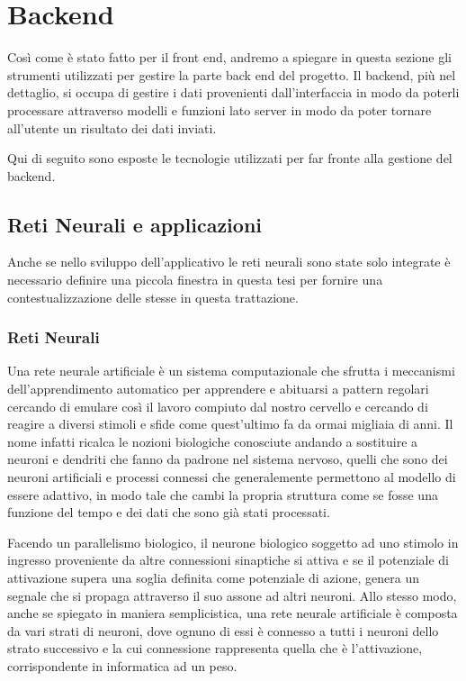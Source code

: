 \chapter{Backend}\label{ch:backend}

Così come è stato fatto per il front end, andremo a spiegare in questa sezione gli strumenti utilizzati per gestire la parte back end del progetto. Il backend, più nel dettaglio, si occupa di gestire i dati provenienti dall'interfaccia in modo da poterli processare attraverso modelli e funzioni lato server in modo da poter tornare all'utente un risultato dei dati inviati.

Qui di seguito sono esposte le tecnologie utilizzati per far fronte alla gestione del backend.

\section{Reti Neurali e applicazioni}

Anche se nello sviluppo dell'applicativo le reti neurali sono state solo integrate è necessario definire una piccola finestra in questa tesi per fornire una contestualizzazione delle stesse in questa trattazione.

\subsection{Reti Neurali}

Una rete neurale artificiale è un sistema computazionale che sfrutta i meccanismi dell'apprendimento automatico per apprendere e abituarsi a pattern regolari cercando di emulare così il lavoro compiuto dal nostro cervello e cercando di reagire a diversi stimoli e sfide come quest'ultimo fa da ormai migliaia di anni. Il nome infatti ricalca le nozioni biologiche conosciute andando a sostituire a neuroni e dendriti che fanno da padrone nel sistema nervoso, quelli che sono dei neuroni artificiali e processi connessi che generalemente permettono al modello di essere adattivo, in modo tale che cambi la propria struttura come se fosse una funzione del tempo e dei dati che sono già stati processati.

Facendo un parallelismo biologico, il neurone biologico soggetto ad uno stimolo in ingresso proveniente da altre connessioni sinaptiche  si attiva e se il potenziale di attivazione supera una soglia definita come potenziale di azione, genera un segnale che si propaga attraverso il suo assone ad altri neuroni. Allo stesso modo, anche se spiegato in maniera semplicistica,  una rete neurale artificiale è composta da vari strati di neuroni, dove ognuno di essi è connesso a tutti i neuroni dello strato successivo e la cui connessione rappresenta quella che è l'attivazione, corrispondente in informatica ad un peso.

